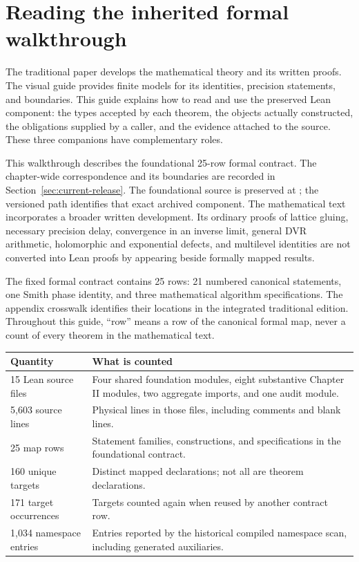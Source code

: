 \section{Reading the inherited formal walkthrough}\label{sec:orientation}

The traditional paper develops the mathematical theory and its written proofs. The visual guide provides finite models for its identities, precision statements, and boundaries. This guide explains how to read and use the preserved Lean component: the types accepted by each theorem, the objects actually constructed, the obligations supplied by a caller, and the evidence attached to the source. These three companions have complementary roles.

This walkthrough describes the foundational 25-row formal contract. The chapter-wide correspondence and its boundaries are recorded in Section~\ref{sec:current-release}. The foundational source is preserved at ; the versioned path identifies that exact archived component. The mathematical text incorporates a broader written development. Its ordinary proofs of lattice gluing, necessary precision delay, convergence in an inverse limit, general DVR arithmetic, holomorphic and exponential defects, and multilevel identities are not converted into Lean proofs by appearing beside formally mapped results.

The fixed formal contract contains 25 rows: 21 numbered canonical statements, one Smith phase identity, and three mathematical algorithm specifications. The appendix crosswalk identifies their locations in the integrated traditional edition. Throughout this guide, ``row'' means a row of the canonical formal map, never a count of every theorem in the mathematical text.

\begin{tabular}{p{}p{}}
\toprule Quantity & What is counted \\\midrule
15 Lean source files & Four shared foundation modules, eight substantive Chapter II modules, two aggregate imports, and one audit module. \\
5,603 source lines & Physical lines in those files, including comments and blank lines. \\
25 map rows & Statement families, constructions, and specifications in the foundational contract. \\
160 unique targets & Distinct mapped declarations; not all are theorem declarations. \\
171 target occurrences & Targets counted again when reused by another contract row. \\
1,034 namespace entries & Entries reported by the historical compiled namespace scan, including generated auxiliaries. \\
\bottomrule
\end{tabular}

